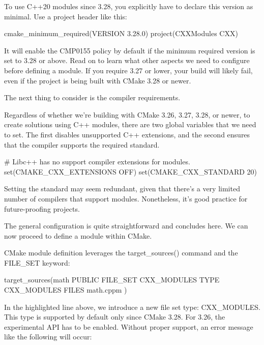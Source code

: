 
To use C++20 modules since 3.28, you explicitly have to declare this version as minimal. Use a project header like this:

\begin{cmake}
cmake_minimum_required(VERSION 3.28.0)
project(CXXModules CXX)
\end{cmake}

It will enable the CMP0155 policy by default if the minimum required version is set to 3.28 or above. Read on to learn what other aspects we need to configure before defining a module. If you require 3.27 or lower, your build will likely fail, even if the project is being built with CMake 3.28 or newer.

The next thing to consider is the compiler requirements.


Regardless of whether we’re building with CMake 3.26, 3.27, 3.28, or newer, to create solutions using C++ modules, there are two global variables that we need to set. The first disables unsupported C++ extensions, and the second ensures that the compiler supports the required standard.


\begin{cmake}
# Libc++ has no support compiler extensions for modules.
set(CMAKE_CXX_EXTENSIONS OFF)
set(CMAKE_CXX_STANDARD 20)
\end{cmake}

Setting the standard may seem redundant, given that there’s a very limited number of compilers that support modules. Nonetheless, it’s good practice for future-proofing projects.

The general configuration is quite straightforward and concludes here. We can now proceed to define a module within CMake.


CMake module definition leverages the target\_sources() command and the FILE\_SET keyword:

\begin{cmake}
target_sources(math
    PUBLIC FILE_SET CXX_MODULES TYPE CXX_MODULES FILES math.cppm
)
\end{cmake}

In the highlighted line above, we introduce a new file set type: CXX\_MODULES. This type is supported by default only since CMake 3.28. For 3.26, the experimental API has to be enabled. Without proper support, an error message like the following will occur:

